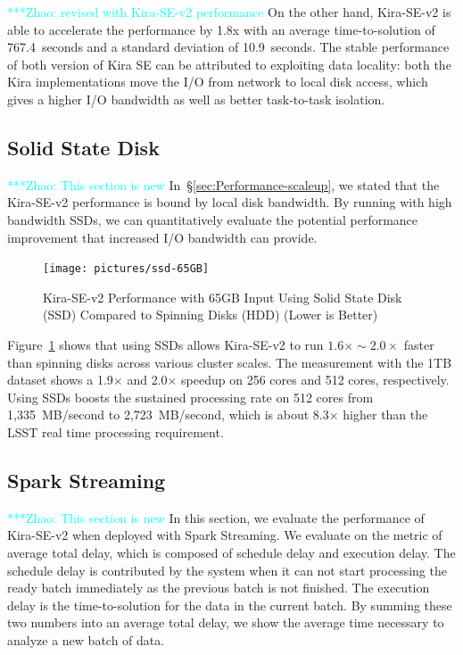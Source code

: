 \documentclass[10pt,journal,compsoc]{IEEEtran}
\newcommand{\zhaonote}[1]{{\textcolor{cyan}    { ***Zhao:      #1 }}}
\newcommand{\zhaonote}[1]{}
\begin{document}
\zhaonote{revised with Kira-SE-v2 performance}
On the other hand, Kira-SE-v2 is able to accelerate the performance by 1.8x with an average time-to-solution of
767.4~seconds and a standard deviation of 10.9~seconds. The stable performance of both version of Kira SE
can be attributed to exploiting data locality: both the Kira implementations move the I/O from network
to local disk access, which gives a higher I/O bandwidth as well as better task-to-task isolation.

\subsection{Solid State Disk}
\zhaonote{This section is new}
In~\S\ref{sec:Performance-scaleup}, we stated that the Kira-SE-v2 performance is bound by local disk bandwidth.
By running with high bandwidth SSDs, we can quantitatively evaluate the potential performance improvement that
increased I/O bandwidth can provide.

\begin{figure}[h]
	\begin{center}
		\texttt{[image: pictures/ssd-65GB]}
		\caption{Kira-SE-v2 Performance with 65GB Input Using Solid State Disk (SSD) Compared to Spinning Disks (HDD)  (Lower is Better)
		\label{fig:ssd-65GB}}
  	\end{center}
\end{figure}

Figure~\ref{fig:ssd-65GB} shows that using SSDs allows Kira-SE-v2 to run $1.6\times\sim2.0\times$ faster than spinning disks across various cluster scales.
The measurement with the 1TB dataset  shows a 1.9$\times$ and 2.0$\times$ speedup on 256 cores and 512 cores, respectively.
Using SSDs boosts the sustained processing rate on 512 cores from 1,335~MB/second to 2,723~MB/second, which is about 8.3$\times$ higher
than the LSST real time processing requirement.

\subsection{Spark Streaming}
\zhaonote{This section is new}
In this section, we evaluate the performance of Kira-SE-v2 when deployed with Spark Streaming. We evaluate on the metric of average total delay,
which is composed of schedule delay and execution delay.
The schedule delay is contributed by the system when it can not start processing the ready batch immediately as the previous batch is not finished.
The execution delay is the time-to-solution for the data in the current batch.
By summing these two numbers into an average total delay, we show the average time necessary to analyze a new batch of data.
\end{document}
